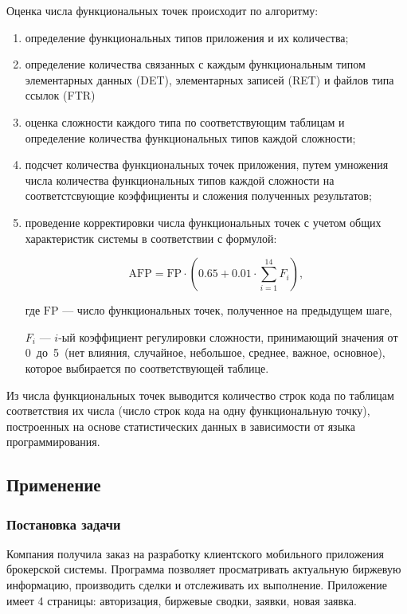 Оценка числа функциональных точек происходит по алгоритму:

\begin{enumerate}
    \item определение функциональных типов приложения и их количества;
    \item определение количества связанных с каждым функциональным типом элементарных данных (DET), элементарных записей (RET) и файлов типа ссылок (FTR)
    \item оценка сложности каждого типа по соответствующим таблицам и определение количества функциональных типов каждой сложности;
    \item подсчет количества функциональных точек приложения, путем умножения числа количества функциональных типов каждой сложности на соответстсвующие коэффициенты и сложения полученных результатов;
    \item проведение корректировки числа функциональных точек  с учетом общих характеристик системы в соответствии с формулой:

    $$\text{AFP} = \text{FP} \cdot (0.65 + 0.01 \cdot \sum\limits_{i = 1}^{14} F_i),$$

    где $\text{FP}$ --- число функциональных точек, полученное на предыдущем шаге,

    $F_i$ --- $i$-ый коэффициент регулировки сложности, принимающий значения от 0~до~5~(нет влияния, случайное, небольшое, среднее, важное, основное), которое выбирается по соответствующей таблице.
\end{enumerate}

Из числа функциональных точек выводится количество строк кода по таблицам соответствия их числа (число строк кода на одну функциональную точку), построенных на основе статистических данных в зависимости от языка программирования.

\subsection{Применение}

\subsubsection{Постановка задачи}

Компания получила заказ на разработку клиентского мобильного приложения брокерской системы. Программа позволяет просматривать актуальную биржевую информацию, производить сделки и отслеживать их выполнение. Приложение имеет 4 страницы: авторизация, биржевые сводки, заявки, новая заявка.

